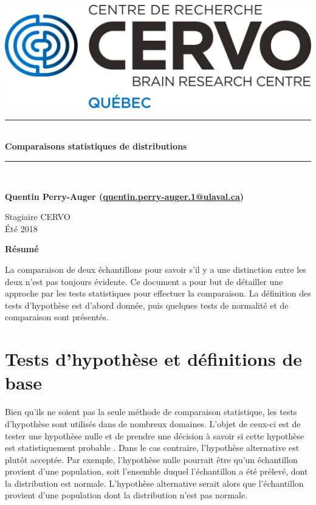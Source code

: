 \documentclass{article}       %
\newcommand{\HRule}{\rule{\linewidth}{0.5mm}}
\begin{document}

\begin{titlepage}  %
\begin{center}   %
\includegraphics[scale=0.5]{fig/logo.png}\\
\vspace{1cm}


\HRule\\[0.4cm]
{\large\bfseries Comparaisons statistiques de distributions}
\HRule\\[1.75cm]


\vfill

{\bfseries Quentin Perry-Auger (\url{quentin.perry-auger.1@ulaval.ca})}

\vfill

Stagiaire CERVO\\ Été 2018


\vfill

\end{center}

\textbf{\Large Résumé}

La comparaison de deux échantillons pour savoir s'il y a une distinction entre les deux n'est pas toujours évidente. Ce document a pour but de détailler une approche par les tests statistiques pour effectuer la comparaison. La définition des tests d'hypothèse est d'abord donnée, puis quelques tests de normalité et de comparaison sont présentés.


\end{titlepage}

\section{Tests d'hypothèse et définitions de base}
\label{Sec:Hypot}

Bien qu'ils ne soient pas la seule méthode de comparaison statistique, les tests d'hypothèse sont utilisés dans de nombreux domaines. L'objet de ceux-ci est de tester une hypothèse nulle et de prendre une décision à savoir si cette hypothèse est statistiquement probable \cite{Hypot}. Dans le cas contraire, l'hypothèse alternative est plutôt acceptée. Par exemple, l'hypothèse nulle pourrait être qu'un échantillon provient d'une population, soit l'ensemble duquel l'échantillon a été prélevé, dont la distribution est normale. L'hypothèse alternative serait alors que l'échantillon provient d'une population dont la distribution n'est pas normale.
\end{document}
